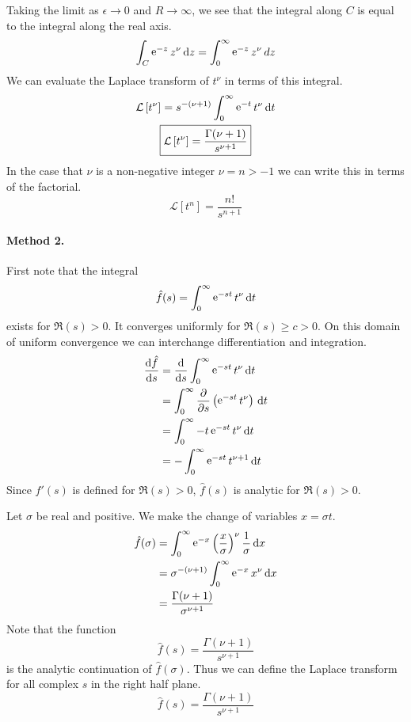 {\begin{Solution}
  Taking the limit as $\epsilon \to 0$ and $R \to \infty$, we see that the integral along $C$
  is equal to the integral along the real axis.
  \[ 
  \int_C \mathop{\mathrm{e}}\nolimits^{-z} z^\nu \,\mathrm{d} z = \int_0^\infty \mathop{\mathrm{e}}\nolimits^{-z} z^\nu \, dz
  \]
  We can evaluate the Laplace transform of $t^\nu$ in terms of this integral.
  \begin{gather*}
    \mathcal{L} \left[ t^\nu \right] = s^{-(\nu+1)} \int_0^\infty \mathop{\mathrm{e}}\nolimits^{-t} t^{\nu} \,\mathrm{d} t \\
    \boxed{
      \mathcal{L} \left[ t^\nu \right] = \frac{\Gamma(\nu + 1)}{s^{\nu+1}}
      } 
  \end{gather*}
  In the case that $\nu$ is a non-negative integer $\nu = n > -1$ we can write 
  this in terms of the factorial.
  \[
  \mathcal{L} \left[ t^n \right] = \frac{n!}{s^{n+1}}
  \]



  \paragraph{Method 2.}
  First note that the integral
  \[
  \hat{f}(s) = \int_0^\infty \mathop{\mathrm{e}}\nolimits^{-s t} t^\nu \,\mathrm{d} t
  \]
  exists for $\Re(s) > 0$.  It converges uniformly for $\Re(s) \geq c > 0$.
  On this domain of uniform convergence we can interchange differentiation
  and integration.
  \begin{align*}
    \frac{\mathrm{d} \hat{f}}{\mathrm{d} s} 
    &= \frac{\mathrm{d}}{\mathrm{d} s} \int_0^\infty \mathop{\mathrm{e}}\nolimits^{-s t} t^\nu \,\mathrm{d} t \\
    &= \int_0^\infty \frac{\partial}{\partial s} \left( \mathop{\mathrm{e}}\nolimits^{-s t} t^{\nu} \right) \,\mathrm{d} t \\
    &= \int_0^\infty -t \mathop{\mathrm{e}}\nolimits^{-s t} t^{\nu} \,\mathrm{d} t \\
    &= - \int_0^\infty \mathop{\mathrm{e}}\nolimits^{-s t} t^{\nu+1} \,\mathrm{d} t 
  \end{align*}
  Since $\hat{f}'(s)$ is defined for $\Re(s) > 0$, $\hat{f}(s)$ is analytic for 
  $\Re(s)>0$.

  Let $\sigma$ be real and positive.  We make the change of variables $x = \sigma t$.
  \begin{align*}
    \hat{f}(\sigma)    
    &= \int_0^\infty \mathop{\mathrm{e}}\nolimits^{-x} \left( \frac{x}{\sigma} \right)^\nu \frac{1}{\sigma} \,\mathrm{d} x \\
    &= \sigma^{-(\nu+1)} \int_0^\infty \mathop{\mathrm{e}}\nolimits^{-x} x^{\nu} \,\mathrm{d} x \\
    &= \frac{\Gamma(\nu+1)}{\sigma^{\nu + 1}}
  \end{align*}
  Note that the function
  \[
  \hat{f}(s) = \frac{\Gamma(\nu+1)}{s^{\nu + 1}}
  \]
  is the analytic continuation of $\hat{f}(\sigma)$.
  Thus we can define the Laplace transform for all
  complex $s$ in the right half plane.
  \[ 
  \boxed{ 
    \hat{f}(s) = \frac{\Gamma(\nu+1)}{s^{\nu + 1}}
    } 
  \]
\end{Solution}









}
